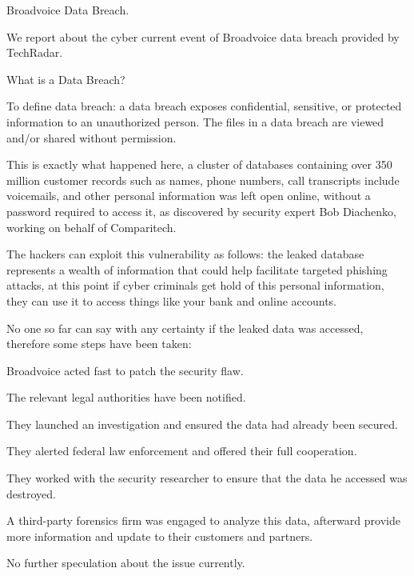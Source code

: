                         Broadvoice Data Breach.

We report about the cyber current event of Broadvoice data breach provided by TechRadar.

What is a Data Breach?

To define data breach: a data breach exposes confidential, sensitive, or protected information to an unauthorized person. The files in a data breach are viewed and/or shared without permission.

This is exactly what happened here, a cluster of databases containing over 350 million customer records such as names, phone numbers, call transcripts include voicemails, and other personal information was left open online, without a password required to access it, as discovered by security expert Bob Diachenko, working on behalf of Comparitech.

The hackers can exploit this vulnerability as follows: the leaked database represents a wealth of information that could help facilitate targeted phishing attacks, at this point if cyber criminals get hold of this personal information, they can use it to access things like your bank and online accounts.

No one so far can say with any certainty if the leaked data was accessed, therefore some steps have been taken:

Broadvoice acted fast to patch the security flaw.

The relevant legal authorities have been notified.

They launched an investigation and ensured the data had already been secured.

They alerted federal law enforcement and offered their full cooperation.

They worked with the security researcher to ensure that the data he accessed was destroyed.

A third-party forensics firm was engaged to analyze this data, afterward provide more information and update to their customers and partners.

No further speculation about the issue currently.

